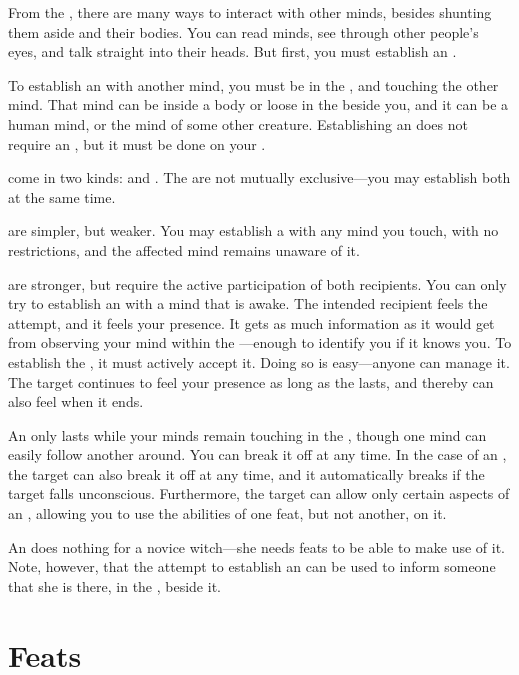 From the {\mentalrealm}, there are many ways to interact with other minds, besides shunting them aside and {\possessing} their bodies.
You can read minds, see through other people's eyes, and talk straight into their heads.
But first, you must establish an {\interface}.

To establish an {\interface} with another mind, you must be in the {\mentalrealm}, and touching the other mind.
That mind can be inside a body or loose in the {\mentalrealm} beside you, and it can be a human mind, or the mind of some other creature.
Establishing an {\interface} does not require an {\action}, but it must be done on your {\turn}.

\capital{\interfaces} come in two kinds: {\overtinterfaces} and {\subtleinterfaces}.
The {\interfaces} are not mutually exclusive---you may establish both at the same time.

\capital{\subtleinterfaces} are simpler, but weaker.
You may establish a {\subtleinterface} with any mind you touch, with no restrictions, and the affected mind remains unaware of it.

\capital{\overtinterfaces} are stronger, but require the active participation of both recipients.
You can only try to establish an {\overtinterface} with a mind that is awake.
The intended recipient feels the attempt, and it feels your presence.
It gets as much information as it would get from observing your mind within the {\mentalrealm}---enough to identify you if it knows you.
To establish the {\interface}, it must actively accept it.
Doing so is easy---anyone can manage it.
The target continues to feel your presence as long as the {\overtinterface} lasts, and thereby can also feel when it ends.

An {\interface} only lasts while your minds remain touching in the {\mentalrealm}, though one mind can easily follow another around.
You can break it off at any time.
In the case of an {\overtinterface}, the target can also break it off at any time, and it automatically breaks if the target falls unconscious.
Furthermore, the target can allow only certain aspects of an {\overtinterface}, allowing you to use the abilities of one feat, but not another, on it.

An {\interface} does nothing for a novice witch---she needs feats to be able to make use of it.
Note, however, that the attempt to establish an {\overtinterface} can be used to inform someone that she is there, in the {\mentalrealm}, beside it.

\section{Feats}

